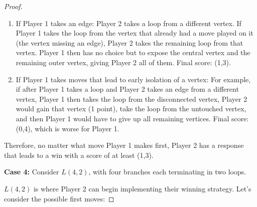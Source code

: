 \documentclass{article}
\begin{document}
\begin{proof}
\begin{enumerate}
    \item If Player 1 takes an edge: Player 2 takes a loop from a different vertex. If Player 1 takes the loop from the vertex that already had a move played on it (the vertex missing an edge), Player 2 takes the remaining loop from that vertex. Player 1 then has no choice but to expose the central vertex and the remaining outer vertex, giving Player 2 all of them. Final score: (1,3).
    
    \item If Player 1 takes moves that lead to early isolation of a vertex: For example, if after Player 1 takes a loop and Player 2 takes an edge from a different vertex, Player 1 then takes the loop from the disconnected vertex, Player 2 would gain that vertex (1 point), take the loop from the untouched vertex, and then Player 1 would have to give up all remaining vertices. Final score: (0,4), which is worse for Player 1.
\end{enumerate}

Therefore, no matter what move Player 1 makes first, Player 2 has a response that leads to a win with a score of at least (1,3).

\textbf{Case 4:} Consider $L(4, 2)$, with four branches each terminating in two loops.

\begin{center}
\end{center}

$L(4,2)$ is where Player 2 can begin implementing their winning strategy. Let's consider the possible first moves:


\end{proof}
\end{document}
